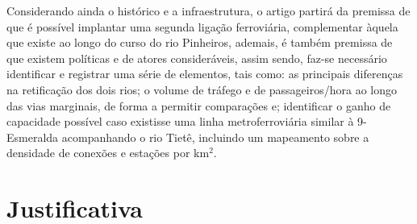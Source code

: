 \documentclass[
	12pt,				%
	openright,			%
	oneside,
	a4paper,			%
	english,			%
	french,				%
	spanish,			%
	brazil,				%
	]{abntex2}
\begin{document}
Considerando ainda o histórico e a infraestrutura, o artigo partirá da premissa de que é possível implantar uma segunda ligação ferroviária, complementar àquela que existe ao longo do curso do rio Pinheiros, ademais, é também premissa de que existem  políticas e de atores consideráveis, assim sendo, faz-se necessário identificar e registrar uma série de elementos, tais como: as principais diferenças na retificação dos dois rios; o volume de tráfego e de passageiros/hora ao longo das vias marginais, de forma a permitir comparações e; identificar o ganho de capacidade possível caso existisse uma linha metroferroviária similar à 9-Esmeralda acompanhando o rio Tietê, incluindo um mapeamento sobre a densidade de conexões e estações por km$^{2}$.


\chapter{Justificativa}

\end{document}
